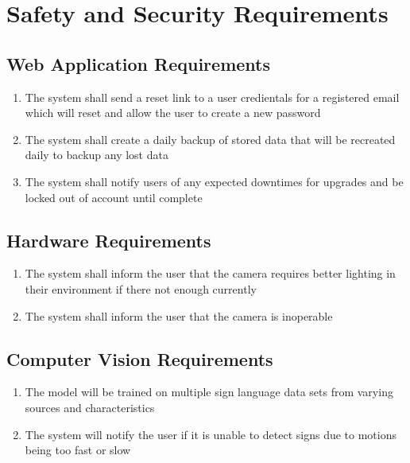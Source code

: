\documentclass{article}
\begin{document}
\section{Safety and Security Requirements}

\subsection{Web Application Requirements}

\begin{enumerate}[label=WAR\arabic*.]
    \item{The system shall send a reset link to a user credientals for a registered email which will reset and allow the user to create a new password}
    \item{The system shall create a daily backup of stored data that will be recreated daily to backup any lost data}
    \item{The system shall notify users of any expected downtimes for upgrades and be locked out of account until complete}
\end{enumerate}

\subsection{Hardware Requirements}

\begin{enumerate}[label=HR\arabic*.]
    \item{The system shall inform the user that the camera requires better lighting in their environment if there not enough currently}
    \item{The system shall inform the user that the camera is inoperable}
\end{enumerate}

\subsection{Computer Vision Requirements}

\begin{enumerate}[label=CVR\arabic*.]
    \item{The model will be trained on multiple sign language data sets from varying sources and characteristics}
    \item{The system will notify the user if it is unable to detect signs due to motions being too fast or slow}
\end{enumerate}
\end{document}
